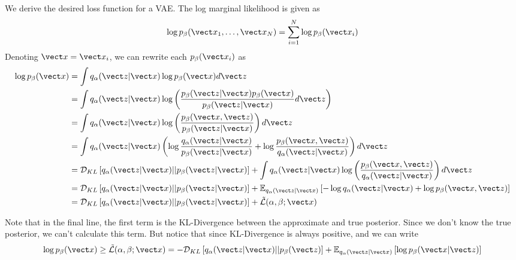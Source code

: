 We derive the desired loss function for a VAE. The log marginal likelihood is given as
\begin{equation}
  \log p_{\beta}(\vect x_1,\ldots,\vect x_N) = \sum_{i=1}^N \log p_{\beta}(\vect x_i)
  \label{eq:vae_marginal}
\end{equation}
Denoting $\vect x = \vect x_i$, we can rewrite each $p_{\beta}(\vect x_i)$ as 
\begin{equation}
  \begin{split}
    \log p_{\beta}(\vect x) &= \int q_\alpha(\vect z |\vect x) \log p_{\beta} (\vect x)d\vect z \\
    &= \int q_\alpha(\vect z | \vect x) \log \left( \frac{p_{\beta}(\vect z | \vect x) p_{\beta}(\vect x)}{p_{\beta}(\vect z | \vect x)} d\vect z \right) \\
    &= \int q_\alpha(\vect z | \vect x) \log \left( \frac{p_{\beta}(\vect x, \vect z)}{p_{\beta}(\vect z | \vect x)} \right) d\vect z\\
    &= \int q_\alpha(\vect z | \vect x) \left( \log \frac{q_\alpha(\vect z | \vect x)}{p_{\beta}(\vect z | \vect x)} + \log \frac{p_{\beta}(\vect x, \vect z)}{q_\alpha(\vect z | \vect x)}\right) d\vect z \\
    &= \mathcal{D}_{KL}\left[ q_\alpha(\vect z |\vect x) || p_{\beta}(\vect z | \vect x) \right] + \int q_\alpha(\vect z | \vect x) \log \left( \frac{p_{\beta}(\vect x, \vect z)}{q_\alpha(\vect z | \vect x)} \right)d\vect z \\
    &= \mathcal{D}_{KL}\left[ q_\alpha(\vect z |\vect x) || p_{\beta}(\vect z | \vect x) \right] + \mathbb{E}_{q_\alpha(\vect z | \vect x)}\left[ -\log q_\alpha(\vect z | \vect x) + \log p_{\beta}(\vect x, \vect z) \right] \\
    &= \mathcal{D}_{KL}\left[ q_\alpha(\vect z |\vect x) || p_{\beta}(\vect z | \vect x) \right] + \tilde{\mathcal{L}}(\alpha, \beta; \vect x)
\label{eq:vae_derive}
  \end{split}
\end{equation}

Note that in the final line, the first term is the KL-Divergence between the approximate and true posterior. Since we don't know the true posterior, we can't calculate this term. But notice that since KL-Divergence is always positive, and we can write 
\begin{equation}
  \begin{split}
    \log p_\beta (\vect x) \geq \tilde{\mathcal{L}}(\alpha, \beta; \vect x) = -\mathcal{D}_{KL}\left[ q_\alpha(\vect z | \vect x) || p_{\beta}(\vect z) \right] + \mathbb{E}_{q_\alpha(\vect z | \vect x)}\left[ \log p_{\beta}(\vect x | \vect z) \right]
  \label{eq:elbo}
\end{split}
\end{equation}


